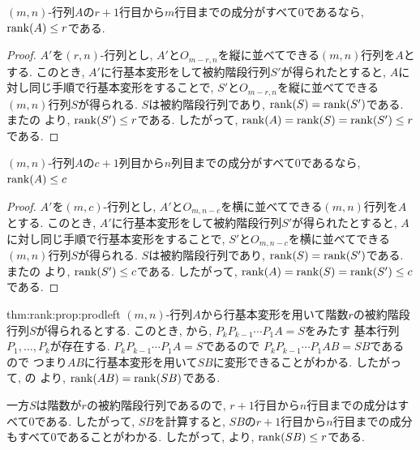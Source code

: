 \begin{lemma}
  \label{lem:rank:rnonzerorows}
  $(m,n)$-行列$A$の$r+1$行目から$m$行目までの成分がすべて$0$であるなら,
  $\operatorname{rank}(A)\leq r$である.
\end{lemma}
\begin{proof}
  $A'$を$(r,n)$-行列とし,
  $A'$と$O_{m-r,n}$を縦に並べてできる$(m,n)$行列を$A$とする.
  このとき, $A'$に行基本変形をして被約階段行列$S'$が得られたとすると,
  $A$に対し同じ手順で行基本変形をすることで,
  $S'$と$O_{m-r,n}$を縦に並べてできる$(m,n)$行列$S$が得られる.
  $S$は被約階段行列であり, $\operatorname{rank}(S)=\operatorname{rank}(S')$である.
  またの
  より, $\operatorname{rank}(S')\leq r$である.
  したがって, $\operatorname{rank}(A)=\operatorname{rank}(S)=\operatorname{rank}(S')\leq r$である.
\end{proof}

\begin{lemma}
  \label{lem:rank:rnonzerocols}
  $(m,n)$-行列$A$の$c+1$列目から$n$列目までの成分がすべて$0$であるなら,
  $\operatorname{rank}(A)\leq c$
\end{lemma}
\begin{proof}
  $A'$を$(m,c)$-行列とし,
  $A'$と$O_{m,n-c}$を横に並べてできる$(m,n)$行列を$A$とする.
  このとき, $A'$に行基本変形をして被約階段行列$S'$が得られたとすると,
  $A$に対し同じ手順で行基本変形をすることで,
  $S'$と$O_{m,n-c}$を横に並べてできる$(m,n)$行列$S$が得られる.
  $S$は被約階段行列であり, $\operatorname{rank}(S)=\operatorname{rank}(S')$である.
  またの
  より, $\operatorname{rank}(S')\leq c$である.
  したがって, $\operatorname{rank}(A)=\operatorname{rank}(S)=\operatorname{rank}(S')\leq c$である.
\end{proof}


\begin{proofof*}{thm:rank:prop:prod}{left}
  $(m,n)$-行列$A$から行基本変形を用いて階数$r$の被約階段行列$S$が得られるとする.
  このとき,
  から,
  $P_kP_{k-1}\cdots P_1A=S$をみたす
  基本行列$P_1,\ldots, P_k$が存在する.
  $P_kP_{k-1}\cdots P_1A=S$であるので
  $P_kP_{k-1}\cdots P_1AB=SB$であるので
  つまり$AB$に行基本変形を用いて$SB$に変形できることがわかる.
  したがって,
  の
  より, $\operatorname{rank}(AB)=\operatorname{rank}(SB)$である.
  
  一方$S$は階数が$r$の被約階段行列であるので,
  $r+1$行目から$n$行目までの成分はすべて$0$である.
  したがって,
  $SB$を計算すると,
  $SB$の$r+1$行目から$n$行目までの成分もすべて$0$であることがわかる.
  したがって, より,
  $\operatorname{rank}(SB)\leq r$である.
\end{proofof*}

